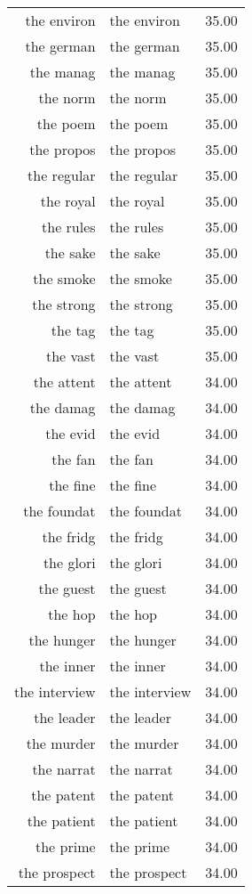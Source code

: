 \begin{table}[ht]
\begin{tabular}{rlr}
  the environ & the environ & 35.00 \\ 
  the german & the german & 35.00 \\ 
  the manag & the manag & 35.00 \\ 
  the norm & the norm & 35.00 \\ 
  the poem & the poem & 35.00 \\ 
  the propos & the propos & 35.00 \\ 
  the regular & the regular & 35.00 \\ 
  the royal & the royal & 35.00 \\ 
  the rules & the rules & 35.00 \\ 
  the sake & the sake & 35.00 \\ 
  the smoke & the smoke & 35.00 \\ 
  the strong & the strong & 35.00 \\ 
  the tag & the tag & 35.00 \\ 
  the vast & the vast & 35.00 \\ 
  the attent & the attent & 34.00 \\ 
  the damag & the damag & 34.00 \\ 
  the evid & the evid & 34.00 \\ 
  the fan & the fan & 34.00 \\ 
  the fine & the fine & 34.00 \\ 
  the foundat & the foundat & 34.00 \\ 
  the fridg & the fridg & 34.00 \\ 
  the glori & the glori & 34.00 \\ 
  the guest & the guest & 34.00 \\ 
  the hop & the hop & 34.00 \\ 
  the hunger & the hunger & 34.00 \\ 
  the inner & the inner & 34.00 \\ 
  the interview & the interview & 34.00 \\ 
  the leader & the leader & 34.00 \\ 
  the murder & the murder & 34.00 \\ 
  the narrat & the narrat & 34.00 \\ 
  the patent & the patent & 34.00 \\ 
  the patient & the patient & 34.00 \\ 
  the prime & the prime & 34.00 \\ 
  the prospect & the prospect & 34.00 \\ 

\end{tabular}
\end{table}
